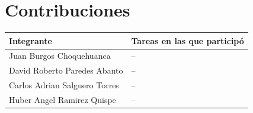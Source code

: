 \documentclass[conference]{IEEEtran}
\begin{document}
\section*{Contribuciones}

\begin{center}
\begin{tabular}{>{\raggedright\arraybackslash}p{}>{\raggedright\arraybackslash}p{}}
\toprule
Integrante & Tareas en las que participó \\
\midrule
Juan Burgos Choquehuanca & -- \\
David Roberto Paredes Abanto & -- \\
Carlos Adrian Salguero Torres & -- \\
Huber Angel Ramirez Quispe & -- \\
\bottomrule
\end{tabular}
\end{center}




\end{document}
